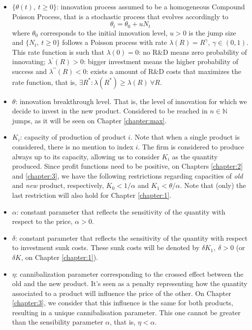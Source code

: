 \begin{itemize}
	\item  $\{ \theta(t), \ t \geq 0 \}$: innovation process assumed to be a homogeneous Compound Poisson Process, that is a stochastic process that evolves accordingly to
	$$\theta_t= \theta_0+ u N_t$$
	where $\theta_0$ corresponds to the initial innovation level, $u > 0$ is the jump size and $\{N_t, \ t \geq 0\}$ follows a Poisson process with rate $\lambda(R)=R^\gamma, \ \gamma \in (0,1)$. This rate function is such that $\lambda(0) = 0$: no R\&D means zero probability of innovating; $\lambda^\prime (R)>0$: bigger investment means the higher probability of success and $ \lambda ^{ \prime \prime} (R)<0$: exists a amount of R\&D costs that maximizes the rate function, that is, $\exists R^*: \lambda(R^*)\geq \lambda(R) \  \forall R$.
	
	\item $\theta$: innovation breakthrough level. That is, the level of innovation for which we decide to invest in the new product. Considered to be reached in $n \in \mathds{N}$ jumps, as it will be seen on Chapter \ref{chapter:max}.
	
	\item $K_i$: capacity of production of product $i$. Note that when a single product is considered, there is no mention to index $i$. The firm is considered to produce always up to its capacity, allowing us to consider $K_i$ as the quantity produced. Since profit functions need to be positive, on Chapters \ref{chapter:2} and \ref{chapter:3}, we have the following restrictions regarding capacities of \textit{old} and \textit{new} product, respectively, $K_0<1/\alpha$ and $K_1<\theta/\alpha$. Note that (only) the last restriction will also hold for Chapter \ref{chapter:1}.
	
	\item $\alpha$: constant parameter that reflects the sensitivity of the quantity with respect to the price, $\alpha>0$.
	
	\item $\delta$: constant parameter that reflects the sensitivity of the quantity with respect to investment sunk costs. These sunk costs will be denoted by $\delta K_1, \  \delta>0$ (or $\delta K$, on Chapter \ref{chapter:1}).
	
	\item $\eta$: cannibalization parameter corresponding to the crossed effect between the old and the new product. It's seen as a penalty representing how the quantity associated to a product will influence the price of the other. On Chapter \ref{chapter:3}, we consider that this influence is the same for both products, resulting in a unique cannibalisation parameter. This one cannot be greater than the sensibility parameter $\alpha$, that is, $\eta <\alpha$.
\end{itemize}